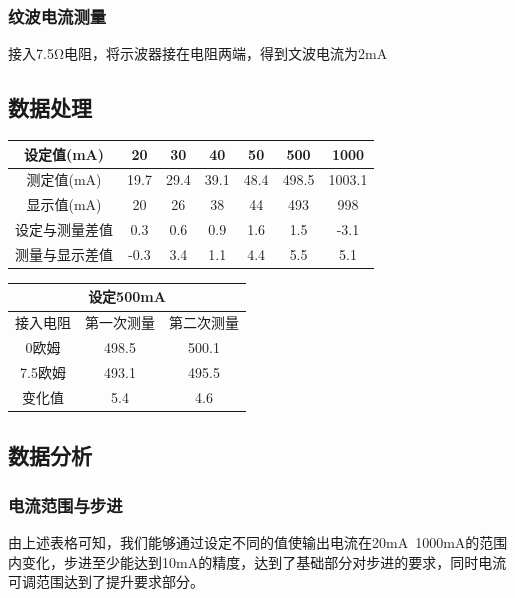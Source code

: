 \documentclass{../source/zjureport}
\begin{document}
            \subsubsection{纹波电流测量}
            接入7.5Ω电阻，将示波器接在电阻两端，得到文波电流为2mA
        \subsection{数据处理}
        \begin{table}[htp]
            \centering
            \begin{tabular}{|c|c|c|c|c|c|c|}
            \hline
            设定值(mA) & 20   & 30   & 40   & 50   & 500   & 1000   \\ \hline
            测定值(mA) & 19.7 & 29.4 & 39.1 & 48.4 & 498.5 & 1003.1 \\ \hline
            显示值(mA) & 20   & 26   & 38   & 44   & 493   & 998    \\ \hline
            设定与测量差值 & 0.3  & 0.6  & 0.9  & 1.6  & 1.5   & -3.1   \\ \hline
            测量与显示差值 & -0.3 & 3.4  & 1.1  & 4.4  & 5.5   & 5.1    \\ \hline
            \end{tabular}
            \end{table}

            \begin{table}[htp]
                \centering
                \begin{tabular}{|c|c|c|}
                \hline
                \multicolumn{3}{|c|}{设定500mA} \\ \hline
                接入电阻     & 第一次测量    & 第二次测量   \\ \hline
                0欧姆      & 498.5    & 500.1   \\ \hline
                7.5欧姆    & 493.1    & 495.5   \\ \hline
                变化值      & 5.4      & 4.6     \\ \hline
                \end{tabular}
                \end{table}
                \newpage
        \subsection{数据分析}
            \subsubsection{电流范围与步进}
            由上述表格可知，我们能够通过设定不同的值使输出电流在20mA~1000mA的范围内变化，步进至少能达到10mA的精度，达到了基础部分对步进的要求，同时电流可调范围达到了提升要求部分。
\end{document}
